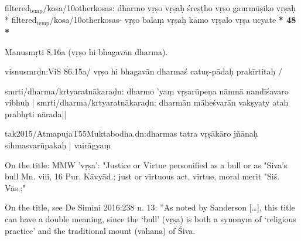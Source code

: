 \documentclass[11pt]{article}
\begin{document}
filtered\(_{\text{temp}}\)/kosa/10otherkosas:   dharmo vṛṣo vṛṣaḥ śreṣṭho vṛṣo gaurmūṣiko vṛṣaḥ *
filtered\(_{\text{temp}}\)/kosa/10otherkosas-   vṛṣo balaṃ vṛṣaḥ kāmo vṛṣalo vṛṣa ucyate \textbf{* 48 *}

Manusmṛti 8.16a (vṛṣo hi bhagavān dharma). 

visnusmrḍn:ViS 86.15a/ vṛṣo hi bhagavān dharmaś catuṣ-pādaḥ prakīrtitaḥ /

smrti/dharma/krtyaratnākaraḍn: dharmo 'yaṃ vṛṣarūpeṇa nāmnā nandīśavaro vibhuḥ |
smrti/dharma/krtyaratnākaraḍn: dharmān māheśvarān vakṣyaty ataḥ prabhṛti nārada||

tak2015/AtmapujaT55Muktabodha.dn:dharmas tatra vṛṣākāro jñānaḥ sihmasvarūpakaḥ | vairāgyaṃ 

On the title:
MMW 'vṛṣa':  "Justice or Virtue personified as a bull or as "Siva's bull Mn. viii, 16 Pur. Kāvyād.;
just or virtuous act, virtue, moral merit "Siś. Vās.;"

On the title, see De Simini 2016:238 n. 13: ''As noted by Sanderson [\ldots{}], this title can have a double meaning,
since the ‘bull’ (vṛṣa) is both a synonym of ‘religious practice’ and the traditional mount (vāhana) of Śiva.
\end{document}
